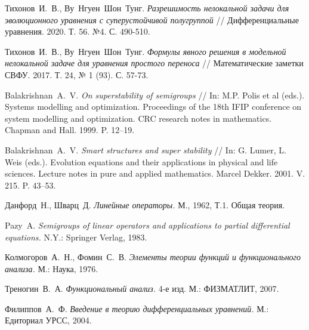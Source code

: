 \documentclass{article}
\theoremstyle{definition}
\begin{document}
\begin{thebibliography}{99}
	

	 Тихонов~И.~В., Ву~Нгуен~Шон~Тунг.
	\emph{Разрешимость нелокальной задачи для эволюционного уравнения с суперустойчивой полугруппой}
	// Дифференциальные уравнения. 2020. Т. 56. №4. С. 490-510.
	
	 Тихонов~И.~В., Ву~Нгуен~Шон~Тунг.
	\emph{Формулы явного решения в модельной нелокальной задаче для уравнения простого переноса}
	// Математические заметки СВФУ. 2017. Т. 24, № 1 (93). С. 57-73.
	
	 Balakrishnan~A.~V.
	\emph{On superstability of semigroups}
	// In: M.P. Polis et al (eds.). Systems modelling and optimization. 
	Proceedings of the 18th IFIP conference on system modelling and optimization. 
	CRC research notes in mathematics. Chapman and Hall. 1999. P. 12–19.
	
	 Balakrishnan~A.~V.
	\emph{Smart structures and super stability} 
	// In: G. Lumer, L. Weis (eds.). Evolution
	equations and their applications in physical and life sciences. Lecture notes in pure and applied
	mathematics. Marcel Dekker. 2001. V. 215. P. 43–53.
	
	 Данфорд~Н., Шварц~Д.
	\emph{Линейные операторы.} М., 1962, Т.1. Общая теория.

	 Pazy~A.
	\emph{Semigroups of linear operators and applications to partial differential equations.} N.Y.: Springer Verlag, 1983.
	
	 Колмогоров~А.~Н., Фомин~С.~В.
	\emph{Элементы теории функций и функционального анализа.} М.: Наука, 1976.
	
	 Треногин~В.~А.
	\emph{Функциональный анализ.} 4-е изд. М.: ФИЗМАТЛИТ, 2007.
	
	 Филиппов~А.~Ф.
	\emph{Введение в теорию дифференциальных уравнений.} М.: Едиториал УРСС, 2004.
\end{thebibliography}
\end{document}
